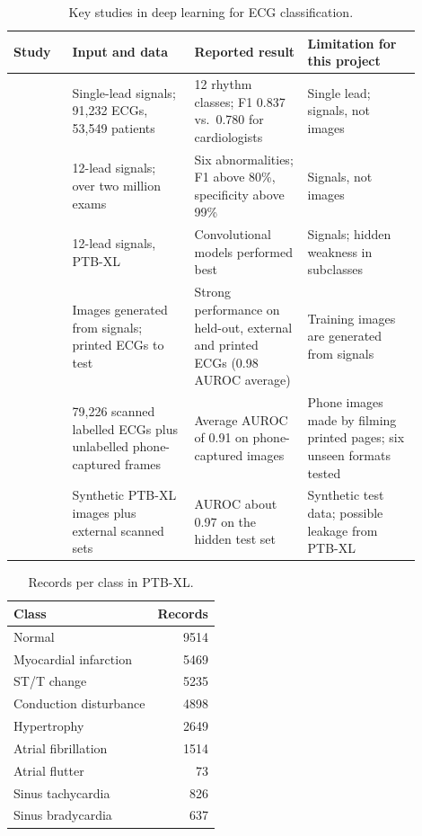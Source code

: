 \documentclass[12pt,nonacm,acmlarge,titlepage,screen]{acmart}
\begin{document}
\begin{table}[H]
  \centering
  \footnotesize
  \caption{Key studies in deep learning for ECG classification.}
  \label{tab:ecg-studies}
  \begin{tabular}{@{}P{0.13\linewidth} P{0.27\linewidth} P{0.25\linewidth} P{0.25\linewidth}@{}}
    \toprule
    \textbf{Study} & \textbf{Input and data} & \textbf{Reported result} &
      \textbf{Limitation for this project} \\
    \midrule
    \citet{hannun_cardiologist_2019} &
      Single-lead signals; 91,232 ECGs, 53,549 patients &
      12 rhythm classes; F1 0.837 vs.\ 0.780 for cardiologists &
      Single lead; signals, not images \\
    \citet{ribeiro_automatic_2020} &
      12-lead signals; over two million exams &
      Six abnormalities; F1 above 80\%, specificity above 99\% &
      Signals, not images \\
    \citet{strodthoff_deep_2021} &
      12-lead signals, PTB-XL &
      Convolutional models performed best &
      Signals; hidden weakness in subclasses \\
    \citet{sangha_automated_2022} &
      Images generated from signals; printed ECGs to test &
      Strong performance on held-out, external and printed ECGs (0.98 AUROC average) &
      Training images are generated from signals \\
    \citet{gliner_domain_2023} &
      79,226 scanned labelled ECGs plus unlabelled phone-captured frames &
      Average AUROC of 0.91 on phone-captured images &
      Phone images made by filming printed pages; six unseen formats tested \\
    \citet{wang_pipeline_2025} &
      Synthetic PTB-XL images plus external scanned sets &
      AUROC about 0.97 on the hidden test set &
      Synthetic test data; possible leakage from PTB-XL \\
    \bottomrule
  \end{tabular}
\end{table}

\begin{table}[H]
  \centering
  \footnotesize
      \caption{Records per class in PTB-XL.}
    \label{tab:class-counts}
    \begin{tabular}{@{}lr@{}}
      \toprule
      \textbf{Class} & \textbf{Records} \\
      \midrule
      Normal & 9514 \\
      Myocardial infarction & 5469 \\
      ST/T change & 5235 \\
      Conduction disturbance & 4898 \\
      Hypertrophy & 2649 \\
      Atrial fibrillation & 1514 \\
      Atrial flutter & 73 \\
      Sinus tachycardia & 826 \\
      Sinus bradycardia & 637 \\
      \bottomrule
    \end{tabular}
\end{table}
\end{document}
